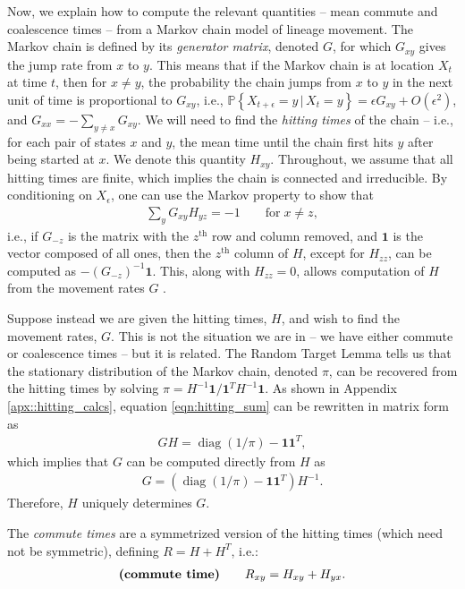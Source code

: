 \documentclass{article}
\DeclareMathOperator{\diag}{\mathop{\mbox{diag}}}
\renewcommand{\P}{\mathbb{P}}
\newcommand{\given}{\,\vert\,}
\newcommand{\PP}[1]{\P\!\left\{#1\right\}}
\newcommand{\bone}{\mathbf{1}}
\begin{document}
Now, we explain how to compute the relevant quantities --
mean commute and coalescence times -- from a Markov chain model of lineage movement.
The Markov chain is defined by its \emph{generator matrix}, denoted $G$,
for which $G_{xy}$ gives the jump rate from $x$ to $y$.
This means that if the Markov chain is at location $X_t$ at time $t$,
then for $x \neq y$, the probability the chain jumps from $x$ to $y$ in the next unit of time
is proportional to $G_{xy}$,
i.e., $\PP{X_{t+\epsilon} = y \given X_t = y} = \epsilon G_{xy} + O(\epsilon^2)$,
and $G_{xx} = - \sum_{y \neq x} G_{xy}$.
We will need to find the \emph{hitting times} of the chain --
i.e., for each pair of states $x$ and $y$, 
the mean time until the chain first hits $y$ after being started at $x$.
We denote this quantity $H_{xy}$.
Throughout, we assume that all hitting times are finite,
which implies the chain is connected and irreducible.
By conditioning on $X_\epsilon$,
one can use the Markov property to show that
\begin{align} \label{eqn:hitting_sum}
    \sum_y G_{xy} H_{yz} = -1 \qquad \text{for} \; x \neq z,
\end{align}
i.e., if $G_{-z}$ is the matrix with the $z^\text{th}$ row and column removed,
and $\bone$ is the vector composed of all ones,
then the $z^\text{th}$ column of $H$, except for $H_{zz}$,
can be computed as $- (G_{-z})^{-1} \bone$.
This, along with $H_{zz} = 0$, allows computation of $H$
from the movement rates $G$ \citep{kemeny1983finite}.

Suppose instead we are given the hitting times, $H$, and wish to find the movement rates, $G$.
This is not the situation we are in -- we have either commute or coalescence times --
but it is related.
The Random Target Lemma \citep{aldous-fill-2014}
tells us that the stationary distribution of the Markov chain, denoted $\pi$,
can be recovered from the hitting times by solving $\pi = H^{-1} \bone / \bone^T H^{-1} \bone$.
As shown in Appendix \ref{apx::hitting_calcs},
equation \eqref{eqn:hitting_sum} can be rewritten in matrix form as
\begin{align}
    G H = \diag(1/\pi) - \bone \bone^T ,
\end{align}
which implies that $G$ can be computed directly from $H$ as
\begin{align} \label{eqn:G_from_H}
    G = \left( \diag(1/\pi) - \bone \bone^T \right) H^{-1} .
\end{align}
Therefore, $H$ uniquely determines $G$.

The \emph{commute times} are a symmetrized version of the hitting times
(which need not be symmetric),
defining $R = H + H^T$, i.e.:
\begin{align} \label{eqn:R_from_H}
\text{\bf (commute time)} \qquad
    R_{xy} = H_{xy} + H_{yx}.
\end{align}
\end{document}
